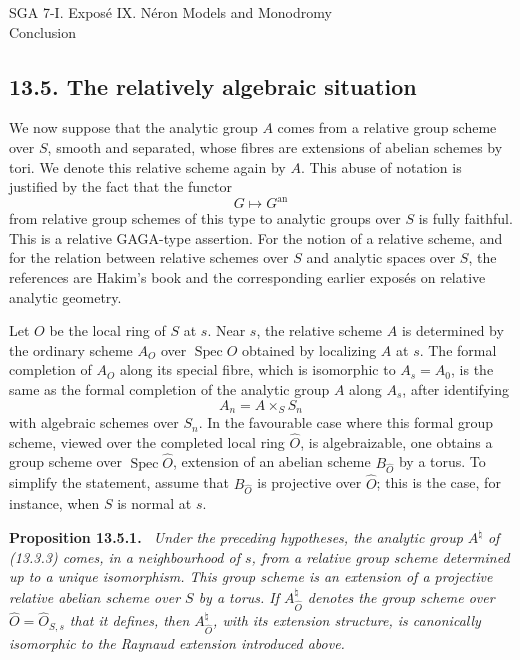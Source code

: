 \documentclass[12pt]{article}
\providecommand{\Spec}{\operatorname{Spec}}
\providecommand{\an}{\mathrm{an}}
\newenvironment{statement}[1]{\par\medskip\noindent\textbf{#1.}\itshape\ }{\par\medskip}
\begin{document}
\begin{center}
{\Large SGA 7-I. Expos\'e IX. N\'eron Models and Monodromy}\\[0.35em]
{\large Conclusion}
\end{center}

\subsection*{13.5. The relatively algebraic situation}

We now suppose that the analytic group $A$ comes from a relative group scheme over $S$, smooth and separated, whose fibres are extensions of abelian schemes by tori.  We denote this relative scheme again by $A$.  This abuse of notation is justified by the fact that the functor
\[
        G\longmapsto G^{\an}
\]
from relative group schemes of this type to analytic groups over $S$ is fully faithful.  This is a relative GAGA-type assertion.  For the notion of a relative scheme, and for the relation between relative schemes over $S$ and analytic spaces over $S$, the references are Hakim's book and the corresponding earlier expos\'es on relative analytic geometry.

Let $O$ be the local ring of $S$ at $s$.  Near $s$, the relative scheme $A$ is determined by the ordinary scheme $A_O$ over $\Spec O$ obtained by localizing $A$ at $s$.  The formal completion of $A_O$ along its special fibre, which is isomorphic to $A_s=A_0$, is the same as the formal completion of the analytic group $A$ along $A_s$, after identifying
\[
        A_n=A\times_S S_n
\]
with algebraic schemes over $S_n$.  In the favourable case where this formal group scheme, viewed over the completed local ring $\widehat O$, is algebraizable, one obtains a group scheme over $\Spec\widehat O$, extension of an abelian scheme $B_{\widehat O}$ by a torus.  To simplify the statement, assume that $B_{\widehat O}$ is projective over $\widehat O$; this is the case, for instance, when $S$ is normal at $s$.

\begin{statement}{Proposition 13.5.1}
Under the preceding hypotheses, the analytic group $A^{\natural}$ of (13.3.3) comes, in a neighbourhood of $s$, from a relative group scheme determined up to a unique isomorphism.  This group scheme is an extension of a projective relative abelian scheme over $S$ by a torus.  If $A^{\natural}_{\widehat O}$ denotes the group scheme over $\widehat O=\widehat O_{S,s}$ that it defines, then $A^{\natural}_{\widehat O}$, with its extension structure, is canonically isomorphic to the Raynaud extension introduced above.
\end{statement}
\end{document}
